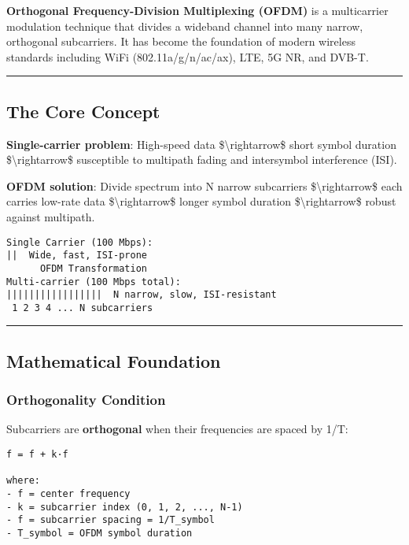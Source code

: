 \textbf{Orthogonal Frequency-Division Multiplexing (OFDM)} is a
multicarrier modulation technique that divides a wideband channel into
many narrow, orthogonal subcarriers. It has become the foundation of
modern wireless standards including WiFi (802.11a/g/n/ac/ax), LTE, 5G
NR, and DVB-T.

\begin{center}\rule{0.5\linewidth}{0.5pt}\end{center}

\subsection{\texorpdfstring{ The Core
Concept}{ The Core Concept}}\label{the-core-concept}

\textbf{Single-carrier problem}: High-speed data
\$\textbackslash rightarrow\$ short symbol duration
\$\textbackslash rightarrow\$ susceptible to multipath fading and
intersymbol interference (ISI).

\textbf{OFDM solution}: Divide spectrum into N narrow subcarriers
\$\textbackslash rightarrow\$ each carries low-rate data
\$\textbackslash rightarrow\$ longer symbol duration
\$\textbackslash rightarrow\$ robust against multipath.

\begin{verbatim}
Single Carrier (100 Mbps):
||  Wide, fast, ISI-prone
      OFDM Transformation 
Multi-carrier (100 Mbps total):
|||||||||||||||||  N narrow, slow, ISI-resistant
 1 2 3 4 ... N subcarriers
\end{verbatim}

\begin{center}\rule{0.5\linewidth}{0.5pt}\end{center}

\subsection{\texorpdfstring{ Mathematical
Foundation}{ Mathematical Foundation}}\label{mathematical-foundation}

\subsubsection{Orthogonality Condition}\label{orthogonality-condition}

Subcarriers are \textbf{orthogonal} when their frequencies are spaced by
1/T:

\begin{verbatim}
f = f + k·f

where:
- f = center frequency
- k = subcarrier index (0, 1, 2, ..., N-1)
- f = subcarrier spacing = 1/T_symbol
- T_symbol = OFDM symbol duration
\end{verbatim}

